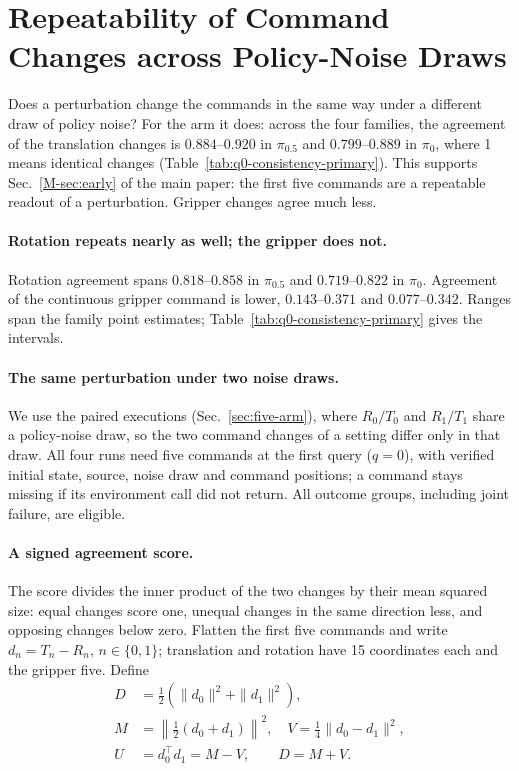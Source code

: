 \section{Repeatability of Command Changes across Policy-Noise Draws}
\label{sec:supp-q0-consistency}
Does a perturbation change the commands in the same way under a different draw of policy noise? For the arm it does: across the four families, the agreement of the translation changes is $0.884$--$0.920$ in $\pi_{0.5}$ and $0.799$--$0.889$ in $\pi_0$, where 1 means identical changes (Table~\ref{tab:q0-consistency-primary}). This supports Sec.~\ref*{M-sec:early} of the main paper: the first five commands are a repeatable readout of a perturbation. Gripper changes agree much less.

\paragraph{Rotation repeats nearly as well; the gripper does not.}
Rotation agreement spans $0.818$--$0.858$ in $\pi_{0.5}$ and $0.719$--$0.822$ in $\pi_0$. Agreement of the continuous gripper command is lower, $0.143$--$0.371$ and $0.077$--$0.342$. Ranges span the family point estimates; Table~\ref{tab:q0-consistency-primary} gives the intervals.

\paragraph{The same perturbation under two noise draws.}
We use the paired executions (Sec.~\ref{sec:five-arm}), where $R_0/T_0$ and $R_1/T_1$ share a policy-noise draw, so the two command changes of a setting differ only in that draw. All four runs need five commands at the first query ($q=0$), with verified initial state, source, noise draw and command positions; a command stays missing if its environment call did not return. All outcome groups, including joint failure, are eligible.

\paragraph{A signed agreement score.}
The score divides the inner product of the two changes by their mean squared size: equal changes score one, unequal changes in the same direction less, and opposing changes below zero. Flatten the first five commands and write $d_n=T_n-R_n$, $n\in\{0,1\}$; translation and rotation have 15 coordinates each and the gripper five. Define
\begin{align}
D&=\tfrac12(\|d_0\|^2+\|d_1\|^2),\\
M&=\left\|\tfrac12(d_0+d_1)\right\|^2,
\quad V=\tfrac14\|d_0-d_1\|^2,\\
U&=d_0^\top d_1=M-V,\qquad D=M+V.
\end{align}


